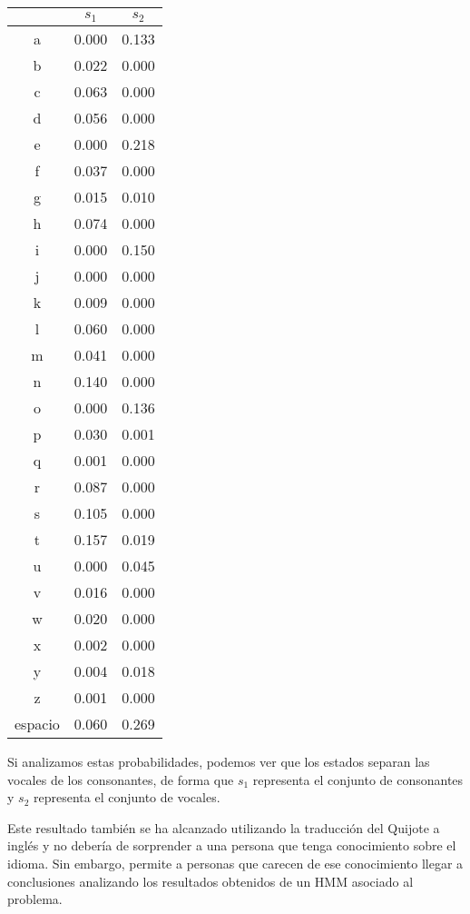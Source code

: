 \begin{exampleth}
\begin{longtable}{|c|c|c|}
        \hline
            & $s_1$ & $s_2$  \\
        \hline
        a & 0.000 & 0.133 \\ 
        \hline 
        b & 0.022 & 0.000 \\
        \hline
        c & 0.063 & 0.000 \\
        \hline
        d & 0.056 & 0.000 \\ 
        \hline
        e & 0.000 & 0.218 \\
        \hline
        f & 0.037 & 0.000 \\
        \hline
        g & 0.015 & 0.010 \\
        \hline
        h & 0.074 & 0.000 \\
        \hline
        i & 0.000 & 0.150 \\
        \hline
        j & 0.000 & 0.000 \\
        \hline
        k & 0.009 & 0.000 \\
        \hline
        l & 0.060 & 0.000 \\
        \hline
        m & 0.041 & 0.000 \\
        \hline
        n & 0.140 & 0.000 \\
        \hline
        o & 0.000 & 0.136 \\
        \hline
        p & 0.030 & 0.001 \\
        \hline
        q & 0.001 & 0.000 \\
        \hline
        r & 0.087 & 0.000 \\
        \hline
        s & 0.105 & 0.000 \\
        \hline
        t & 0.157 & 0.019 \\
        \hline
        u & 0.000 & 0.045 \\
        \hline
        v & 0.016 & 0.000 \\
        \hline
        w & 0.020 & 0.000 \\
        \hline
        x & 0.002 & 0.000 \\
        \hline
        y & 0.004 & 0.018 \\
        \hline
        z & 0.001 & 0.000 \\
        \hline
        espacio & 0.060 & 0.269 \\
        \hline
\end{longtable}
Si analizamos estas probabilidades, podemos ver que los estados separan las vocales de los consonantes, de forma que $s_1$ representa el conjunto de consonantes y $s_2$ representa el conjunto de vocales.

Este resultado también se ha alcanzado utilizando la traducción del Quijote a inglés \cite{AnálisisVoynich} y no debería de sorprender a una persona que tenga conocimiento sobre el idioma. Sin embargo, permite a personas que carecen de ese conocimiento llegar a conclusiones analizando los resultados obtenidos de un HMM asociado al problema.
\end{exampleth}


